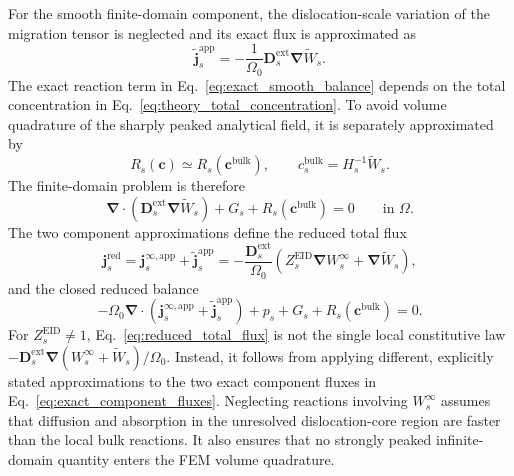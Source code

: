 \documentclass[10pt]{article}
\begin{document}
For the smooth finite-domain component, the dislocation-scale variation of the
migration tensor is neglected and its exact flux is approximated as
\begin{equation}
    \widetilde{\bm j}_s^{\mathrm{app}}
    =
    -\frac{1}{\Omega_0}
    \bm D_s^{\mathrm{ext}}\bm\nabla\widetilde W_s.
    \label{eq:smooth_correction_flux}
\end{equation}
The exact reaction term in Eq.~\eqref{eq:exact_smooth_balance} depends on the
total concentration in Eq.~\eqref{eq:theory_total_concentration}.  To avoid
volume quadrature of the sharply peaked analytical field, it is separately
approximated by
\begin{equation}
    R_s(\bm c)
    \simeq
    R_s(\bm c^{\mathrm{bulk}}),
    \qquad
    c_s^{\mathrm{bulk}}
    =
    H_s^{-1}\widetilde W_s.
    \label{eq:bulk_reaction_concentration}
\end{equation}
The finite-domain problem is therefore
\begin{equation}
    \bm\nabla\cdot
    \left(
    \bm D_s^{\mathrm{ext}}\bm\nabla\widetilde W_s
    \right)
    +G_s
    +R_s(\bm c^{\mathrm{bulk}})
    =0
    \qquad\text{in }\Omega.
    \label{eq:smooth_fem_problem}
\end{equation}
The two component approximations define the reduced total flux
\begin{equation}
    \bm j_s^{\mathrm{red}}
    =
    \bm j_s^{\infty,\mathrm{app}}
    +\widetilde{\bm j}_s^{\mathrm{app}}
    =
    -\frac{\bm D_s^{\mathrm{ext}}}{\Omega_0}
    \left(
    Z_s^{\mathrm{EID}}\bm\nabla W_s^\infty
    +\bm\nabla\widetilde W_s
    \right),
    \label{eq:reduced_total_flux}
\end{equation}
and the closed reduced balance
\begin{equation}
    -\Omega_0\bm\nabla\cdot
    \left(
    \bm j_s^{\infty,\mathrm{app}}
    +\widetilde{\bm j}_s^{\mathrm{app}}
    \right)
    +p_s+G_s+R_s(\bm c^{\mathrm{bulk}})=0.
    \label{eq:reduced_species_balance}
\end{equation}
For $Z_s^{\mathrm{EID}}\ne1$, Eq.~\eqref{eq:reduced_total_flux} is not the
single local constitutive law
$-\bm D_s^{\mathrm{ext}}\bm\nabla(W_s^\infty+\widetilde W_s)/\Omega_0$.
Instead, it follows from applying different, explicitly stated approximations
to the two exact component fluxes in Eq.~\eqref{eq:exact_component_fluxes}.
Neglecting reactions involving $W_s^\infty$ assumes that diffusion and
absorption in the unresolved dislocation-core region are faster than the local
bulk reactions.  It also ensures that no strongly peaked infinite-domain
quantity enters the FEM volume quadrature.
\end{document}

